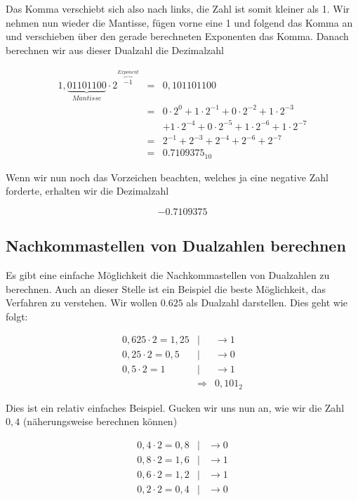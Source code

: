 Das Komma verschiebt sich also nach links, die Zahl ist somit kleiner als 1. Wir nehmen nun wieder die Mantisse, fügen vorne eine 1 und folgend das Komma an und verschieben über den gerade berechneten Exponenten das Komma. Danach berechnen wir aus dieser Dualzahl die Dezimalzahl

\begin{eqnarray}
1,\underbrace{01101100}_{Mantisse} \cdot 2^{\overbrace{-1}^{Exponent}} & = & 0,101101100\\
& = & 0 \cdot 2^{0} + 1 \cdot 2^{-1} + 0 \cdot 2^{-2} + 1 \cdot 2^{-3}\\
& & + 1 \cdot 2^{-4} + 0 \cdot 2^{-5} + 1 \cdot 2^{-6} + 1 \cdot 2^{-7}\\
& = & 2^{-1} + 2^{-3} + 2^{-4} + 2^{-6} + 2^{-7}\\
& = & 0.7109375_{10}
\end{eqnarray}

Wenn wir nun noch das Vorzeichen beachten, welches ja eine negative Zahl forderte, erhalten wir die Dezimalzahl

$$- 0.7109375$$

\subsection{Nachkommastellen von Dualzahlen berechnen}

Es gibt eine einfache Möglichkeit die Nachkommastellen von Dualzahlen zu berechnen. Auch an dieser Stelle ist ein Beispiel die beste Möglichkeit, das Verfahren zu verstehen. Wir wollen $0.625$ als Dualzahl darstellen. Dies geht wie folgt:

\begin{eqnarray}
0,625 \cdot 2 = 1,25 & | & \to 1\\
0,25 \cdot 2 = 0,5 & | & \to 0\\
0,5 \cdot 2 = 1 & | & \to 1\\
& \Rightarrow & 0,101_{2}
\end{eqnarray}

Dies ist ein relativ einfaches Beispiel. Gucken wir uns nun an, wie wir die Zahl $0,4$ (näherungsweise berechnen können)

\begin{eqnarray}
0,4 \cdot 2 = 0,8 & | & \to 0\\
0,8 \cdot 2 = 1,6 & | & \to 1\\
0,6 \cdot 2 = 1,2 & | & \to 1\\
0,2 \cdot 2 = 0,4 & | & \to 0
\end{eqnarray}

